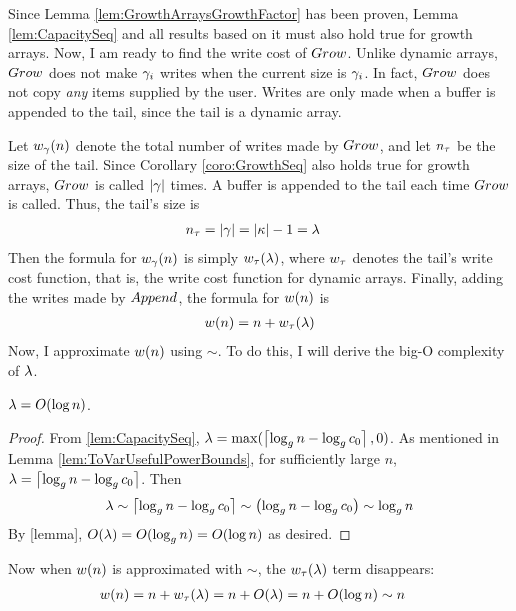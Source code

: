 Since Lemma \ref{lem:GrowthArraysGrowthFactor} has been proven, Lemma \ref{lem:CapacitySeq} and all results based on it must also hold true for growth arrays. Now, I am ready to find the write cost of $Grow$. Unlike dynamic arrays, $Grow$ does not make $\gamma_i$ writes when the current size is $\gamma_i$. In fact, $Grow$ does not copy \textit{any} items supplied by the user. Writes are only made when a buffer is appended to the tail, since the tail is a dynamic array.

Let ${w}_{\gamma}(n)$ denote the total number of writes made by $Grow$, and let $n_\tau$ be the size of the tail. Since Corollary \ref{coro:GrowthSeq} also holds true for growth arrays, $Grow$ is called $|\gamma|$ times. A buffer is appended to the tail each time $Grow$ is called. Thus, the tail's size is
\begin{align*}
n_\tau &= |\gamma| = |\kappa| - 1 = \lambda
\end{align*}
Then the formula for ${w}_{\gamma}(n)$ is simply $w_\tau(\lambda)$, where $w_\tau$ denotes the tail's write cost function, that is, the write cost function for dynamic arrays. Finally, adding the writes made by $Append$, the formula for $w(n)$ is
\begin{align*}
w(n) = n + w_\tau(\lambda)
\end{align*}
Now, I approximate $w(n)$ using $\sim$. To do this, I will derive the big-O complexity of $\lambda$.

\begin{lemma}
\label{lem:VarUsefulIsOLogN}
	$\lambda = O(\log n)$.
\end{lemma}

\begin{proof}
	From \ref{lem:CapacitySeq}, $\lambda = \max(\left\lceil \log_{g} n - \log_{g} c_0 \right\rceil, 0)$. As mentioned in Lemma \ref{lem:ToVarUsefulPowerBounds}, for sufficiently large $n$, $\lambda = \left\lceil \log_{g} n - \log_{g} c_0 \right\rceil$. Then
	\begin{align*}
	\lambda \sim \left\lceil \log_{g} n - \log_{g} c_0 \right\rceil \sim \left( \log_{g} n - \log_{g} c_0 \right) \sim \log_{g} n
	\end{align*}
	By [lemma], $O(\lambda) = O(\log_{g} n) = O(\log n)$ as desired.
\end{proof}

Now when $w(n)$ is approximated with $\sim$, the $w_\tau(\lambda)$ term disappears:
\begin{align*}
w(n) &= n + w_\tau(\lambda) = n + O(\lambda) = n + O(\log n) \sim n
\end{align*}


